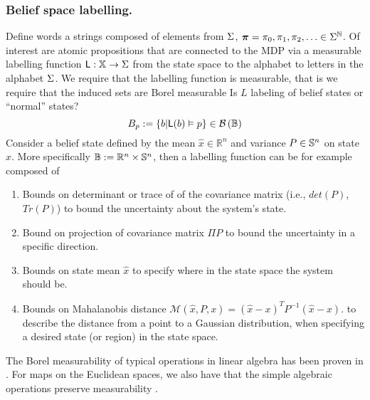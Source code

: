 \documentclass{ifacconf}
\begin{document}
    
    
	\subsubsection{Belief space labelling.}\label{sec:DTL}  
Define words a strings composed of elements from $\alphabeth$, $\word=\letter_0,\letter_1,\letter_2,\ldots\in\alphabeth^{\mathbb{N}}$.
Of interest are atomic propositions that are connected to the MDP via a measurable labelling function $\Lab:\mathbb X\rightarrow \alphabeth$ from the state space to the alphabet to letters in the alphabet $\alphabeth$. 
We require that the labelling function is measurable, that is we require that the induced sets  are Borel measurable
{\color{blue} Is $L$ labeling of belief states or ``normal'' states?}
\[B_p:=\{b|\Lab(b)\vDash p \}\in \borel{\mathbb B}\]      
Consider a belief state defined by the mean $\hat x\in \mathbb R^n $ and variance $P\in \S^n$ on state $x$. More specifically $\mathbb B:=\mathbb R^n\times \S^n$,  then a labelling function  can be for example composed of %
     \begin{enumerate}
 	\item Bounds on determinant or trace of of the covariance matrix (i.e., $det(P)$, $Tr(P)$) to  bound the uncertainty about the system's state.
 	\item Bound on projection of covariance matrix $\Pi P$ to bound the uncertainty in a specific direction.
   \item   Bounds on state mean $\hat{x}$ to specify
    where in the state space the system should be. 
    \item Bounds on Mahalanobis distance $\mathcal{M}(\hat{x},P,x) = (\hat{x}-x)^TP^{-1}(\hat{x}-x)$.
    to describe the distance from a point to a Gaussian distribution, when specifying a desired state (or region) in the state space. 
    \end{enumerate}
 
    The Borel measurability of typical operations in linear algebra has been proven in \citep{azoff1974borel}.
For maps on the Euclidean spaces, we also have that the simple algebraic operations  preserve measurability \citep[page 116]{lang1993real}.
 
\end{document}
